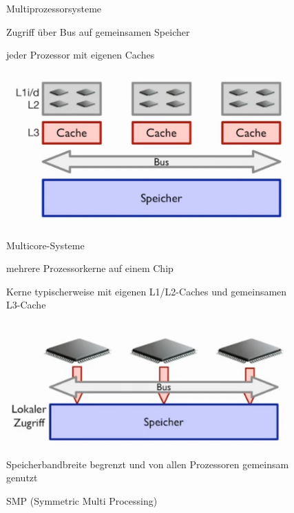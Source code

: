 \documentclass[10pt]{article}
\begin{document}
\begin{figure}[!tbp]
\begin{minipage}[b]{0.45\textwidth}
    \caption{Multiprozessorsysteme}
    \begin{itemize*}
      \item Zugriff über Bus auf gemeinsamen Speicher
      \item jeder Prozessor mit eigenen Caches
    \end{itemize*}
  \end{minipage}
  \hfill
  \begin{minipage}[b]{0.45\textwidth}
    \includegraphics[width=1.0\linewidth]{Assets/Programmierparadigmen-Multicore-Systeme}
    \caption{Multicore-Systeme}
    \begin{itemize*}
      \item mehrere Prozessorkerne auf einem Chip
      \item Kerne typischerweise mit eigenen L1/L2-Caches und gemeinsamen L3-Cache
    \end{itemize*}
  \end{minipage}
  \vfill
  \begin{minipage}[b]{0.45\textwidth}
    \includegraphics[width=1.0\linewidth]{Assets/Programmierparadigmen-SMP}
    \caption{SMP (Symmetric Multi Processing)}
    \begin{itemize*}
      \item Speicherbandbreite begrenzt und von allen Prozessoren gemeinsam genutzt

\end{itemize*}
\end{minipage}
\end{figure}
\end{document}
